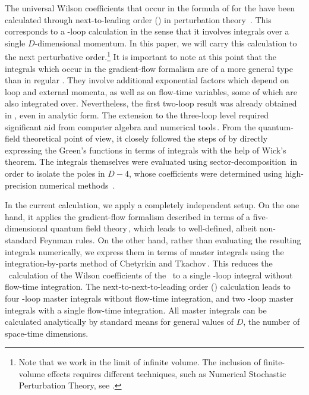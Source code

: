 The universal Wilson coefficients that occur in the formula of
 for the  have been calculated
through next-to-leading order (\nlo) in perturbation
theory~\cite{Suzuki:2013gza,Makino:2014taa}. This corresponds to a
\one-loop calculation in the sense that it involves integrals over a
single $D$-dimensional momentum. In this paper, we will carry this
calculation to the next perturbative order.\footnote{Note that we work
  in the limit of infinite volume. The inclusion of finite-volume
  effects requires different techniques, such as Numerical Stochastic
  Perturbation Theory, see .}  It is
important to note at this point that the integrals which occur in the
gradient-flow formalism are of a more general type than in regular
\qcd. They involve additional exponential factors which depend on loop
and external momenta, as well as on flow-time variables, some of which
are also integrated over. Nevertheless, the first two-loop result was
already obtained in , even in analytic form.  The
extension to the three-loop level required significant aid from computer
algebra and numerical tools\,\cite{Harlander:2016vzb}.  From the
quantum-field theoretical point of view, it closely followed the steps
of  by directly expressing the Green's functions
in terms of integrals with the help of Wick's theorem. The integrals
themselves were evaluated using
sector-decomposition\,\cite{Binoth:2003ak,Smirnov:2013eza} in order to
isolate the poles in $D-4$, whose coefficients were determined using
high-precision numerical methods~\cite{genz,holodborodko}.

In the current calculation, we apply a completely independent setup.  On
the one hand, it applies the gradient-flow formalism described in terms
of a five-dimensional quantum field theory\,\cite{Luscher:2011bx}, which
leads to well-defined, albeit non-standard Feynman rules. On the other
hand, rather than evaluating the resulting integrals numerically, we
express them in terms of master integrals using the integration-by-parts
method of Chetyrkin and Tkachov\,\cite{Chetyrkin:1981qh}. This reduces
the \nlo\ calculation of the Wilson coefficients of the \emt\ to a
single \one-loop integral without flow-time integration. The
next-to-next-to-leading order (\nnlo) calculation leads to four
\two-loop master integrals without flow-time integration, and two
\two-loop master integrals with a single flow-time integration. All
master integrals can be calculated analytically by standard means for
general values of $D$, the number of space-time dimensions.

